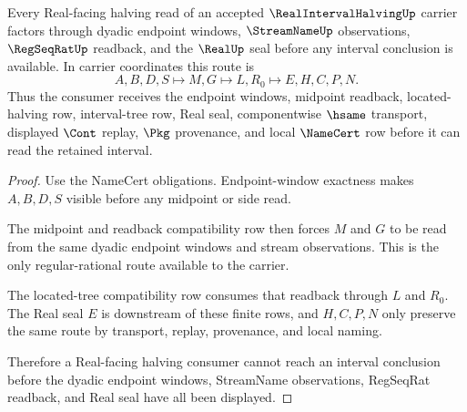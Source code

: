 \begin{theorem}
\label{thm:real-interval-halving-regseqrat-route}
Every Real-facing halving read of an accepted $\RealIntervalHalvingUp$ carrier factors through dyadic endpoint windows, $\StreamNameUp$ observations, $\RegSeqRatUp$ readback, and the $\RealUp$ seal before any interval conclusion is available. In carrier coordinates this route is
$$
A,B,D,S \longmapsto M,G \longmapsto L,R_{0} \longmapsto E,H,C,P,N .
$$
Thus the consumer receives the endpoint windows, midpoint readback, located-halving row, interval-tree row, Real seal, componentwise $\hsame$ transport, displayed $\Cont$ replay, $\Pkg$ provenance, and local $\NameCert$ row before it can read the retained interval.
\end{theorem}
\begin{proof}
Use the NameCert obligations. Endpoint-window exactness makes $A,B,D,S$ visible before any midpoint or side read.

The midpoint and readback compatibility row then forces $M$ and $G$ to be read from the same dyadic endpoint windows and stream observations. This is the only regular-rational route available to the carrier.

The located-tree compatibility row consumes that readback through $L$ and $R_{0}$. The Real seal $E$ is downstream of these finite rows, and $H,C,P,N$ only preserve the same route by transport, replay, provenance, and local naming.

Therefore a Real-facing halving consumer cannot reach an interval conclusion before the dyadic endpoint windows, StreamName observations, RegSeqRat readback, and Real seal have all been displayed.
\end{proof}



